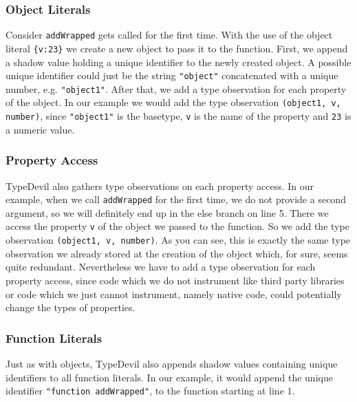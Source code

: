 \documentclass[runningheads,a4paper]{llncs}
\begin{document}
\subsubsection{Object Literals}
Consider \lstinline[columns=fixed]{addWrapped} gets called for the first time.
With the use of the object literal \lstinline[columns=fixed]!{v:23}! we create a new object to pass it to the function.
First, we append a shadow value holding a unique identifier to the newly created object. A possible unique identifier could just be the string \lstinline[columns=fixed]{"object"} concatenated with a unique number, e.g. \lstinline[columns=fixed]{"object1"}.
After that, we add a type observation for each property of the object.
In our example we would add the type observation \lstinline[columns=fixed]{(object1, v, number)}, since \lstinline[columns=fixed]{"object1"} is the basetype, \lstinline[columns=fixed]{v} is the name of the property and \lstinline[columns=fixed]{23} is a numeric value.

\subsubsection{Property Access}
TypeDevil also gathers type observations on each property access.
In our example, when we call \lstinline[columns=fixed]{addWrapped} for the first time, we do not provide a second argument, so we will definitely end up in the else branch on line 5. 
There we access the property \lstinline[columns=fixed]{v} of the object we passed to the function.
So we add the type observation \lstinline[columns=fixed]{(object1, v, number)}.
As you can see, this is exactly the same type observation we already stored at the creation of the object which, for sure, seems quite redundant. 
Nevertheless we have to add a type observation for each property access, since code which we do not instrument like third party libraries or code which we just cannot instrument, namely native code, could potentially change the types of properties.

\subsubsection{Function Literals}
Just as with objects, TypeDevil also appends shadow values containing unique identifiers to all function literals.
In our example, it would append the unique identifier \lstinline[columns=fixed]{"function addWrapped"}, to the function starting at line 1.
\end{document}
